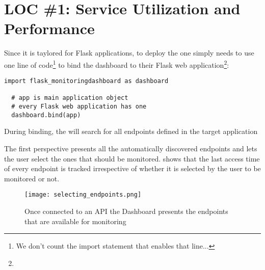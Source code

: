 

  \newpage
  \section{LOC \#1: Service Utilization and Performance}

  Since it is taylored for Flask applications, to deploy the \tool one simply needs to use one line of code\footnote{We don't count the import statement that enables that line...} to bind the dashboard to their Flask web application\footnote{}:

  \begin{lstlisting}[style=custompython]
  import flask_monitoringdashboard as dashboard

  # app is main application object
  # every Flask web application has one
  dashboard.bind(app) 

  \end{lstlisting}


  During binding, the \tool will search for all endpoints defined in the target application 
% 
% 

 The first perspective presents all the automatically discovered endpoints and lets the user select the ones that should be monitored. 
   shows that the last access time of every endpoint is tracked irrespective of whether it is selected by the user to be monitored or not. 


    \begin{figure}[h!]
      \centering
      \texttt{[image: selecting\_endpoints.png]}
      \caption{Once connected to an API the Dashboard presents the endpoints that are available for monitoring}
      \label{fig:sep}
    \end{figure}

